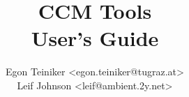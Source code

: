 \documentclass{book}
\author{
  Egon Teiniker <egon.teiniker@tugraz.at>\\
  Leif Johnson <leif@ambient.2y.net>
}
\title{{\Huge CCM Tools}\\User's Guide}
\begin{document}
\maketitle
{}
\tableofcontents
\listoffigures

\newpage
{}
\setlength{\parskip}{1em}


%
%
%
%
%

\begin{appendix}

\end{appendix}



\end{document}
